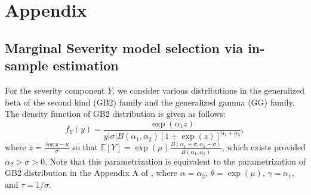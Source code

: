 \documentclass[11pt]{article}
\begin{document}
\newpage



%
%
%

\pagebreak
\section*{Appendix}

\subsection*{Marginal Severity model selection via in-sample estimation}

For the severity component $Y$, we consider various distributions in the generalized beta of the second kind (GB2) family and the generalized gamma (GG) family. The density function of GB2 distribution is given as follows:
$$
f_{Y}(y)={\frac {\exp(\alpha_1 z)}{y |\sigma| B(\alpha_1,\alpha_2)[1+\exp(z)]^{\alpha_1+\alpha_2}}},
$$
where  $z=\frac{\log y - \mu}{\sigma}$ so that $\mathbb{E}[Y]=\exp(\mu) \frac{B(\alpha_1+\sigma, \alpha_2-\sigma)}{B(\alpha_1, \alpha_2)}$, which exists provided $\alpha_2>\sigma>0$. Note that this parametrization is equivalent to the parametrization of GB2 distribution in the Appendix A of \citet{Klugman2012}, where $\alpha=\alpha_2$, $\theta= \exp(\mu)$, $\gamma=\alpha_1$, and $\tau=1/\sigma$. 
\end{document}
